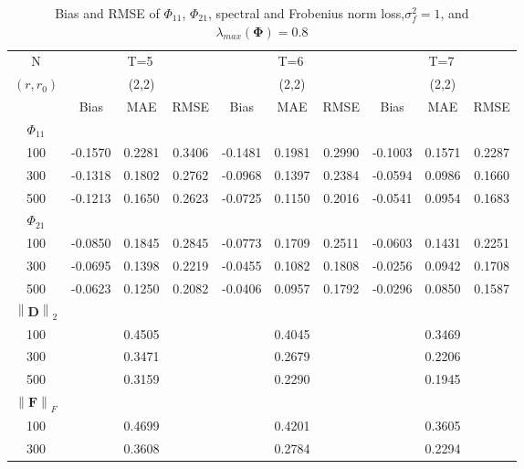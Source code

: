 \documentclass[12pt,a4paper,hyperref]{article}
\begin{document}
\begin{table}[H]
\caption{Bias and RMSE of $\Phi_{11}$, $\Phi_{21}$, spectral and Frobenius norm loss,$\sigma^{2}_{f}=1$,  and $\lambda_{max}(\boldsymbol{\Phi})=0.8$}
\centering
\tabcolsep=0.11cm
\begin{threeparttable}
\begin{tabular} {*{10}{c}}
\toprule
N& \multicolumn{3}{c}{T=5}&\multicolumn{3}{c}{T=6}&\multicolumn{3}{c}{T=7}\\
\cmidrule(lr){1-10}
$(r,r_{0})$ &   &(2,2)  &  &   &(2,2)  & &  &(2,2) & \\
\cmidrule(lr){1-4} \cmidrule(lr){5-7}\cmidrule(lr){8-10}
& \multicolumn{1}{c}{Bias} &\multicolumn{1}{c}{MAE}& \multicolumn{1}{c}{RMSE}&\multicolumn{1}{c}{Bias} &\multicolumn{1}{c}{MAE}& \multicolumn{1}{c}{RMSE}&\multicolumn{1}{c}{Bias}&\multicolumn{1}{c}{MAE} & \multicolumn{1}{c}{RMSE}\\
  \cmidrule(lr){2-4} \cmidrule(lr){5-7} \cmidrule(lr){8-10}
 $\Phi_{11}$\\
\cmidrule(lr){1-10}
 100&-0.1570&0.2281 & 0.3406& -0.1481 & 0.1981& 0.2990&-0.1003& 0.1571& 0.2287\\
300&-0.1318 & 0.1802& 0.2762&  -0.0968&0.1397 &0.2384 &-0.0594 &0.0986 &0.1660\\
500& -0.1213& 0.1650&0.2623& -0.0725 &0.1150 &0.2016 &-0.0541 & 0.0954&0.1683 \\
\cmidrule(lr){1-10}
$\Phi_{21}$\\
\cmidrule(lr){1-4}   \cmidrule(lr){5-7}   \cmidrule(lr){8-10}
100&-0.0850& 0.1845&0.2845 &-0.0773  & 0.1709& 0.2511& -0.0603&0.1431 & 0.2251\\
300&-0.0695 & 0.1398&0.2219 &-0.0455  & 0.1082& 0.1808&-0.0256 &0.0942 &0.1708\\
500&-0.0623 & 0.1250& 0.2082& -0.0406 &0.0957 & 0.1792&-0.0296 & 0.0850& 0.1587\\
\cmidrule(lr){1-10}
$\left\| \boldsymbol{D} \right\|_{2} $\\
\cmidrule(lr){1-4}   \cmidrule(lr){5-7}   \cmidrule(lr){8-10}
100& &0.4505& &  &0.4045 & & & 0.3469&\\
300& & 0.3471& &  &0.2679 & & &0.2206 &\\
500& & 0.3159& &  & 0.2290& & & 0.1945& \\
\cmidrule(lr){1-10}
$\left\| \boldsymbol{F} \right\|_{F} $\\
\cmidrule(lr){1-4}   \cmidrule(lr){5-7}   \cmidrule(lr){8-10}
100& &0.4699 & &  & 0.4201& & & 0.3605& \\
300& &0.3608 & &  & 0.2784& & & 0.2294&\\

\end{tabular}
\end{threeparttable}
\end{table}
\end{document}
